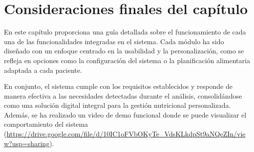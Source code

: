 \section{Consideraciones finales del capítulo}
En este capítulo proporciona una guía detallada sobre el funcionamiento de cada una de las funcionalidades integradas en el sistema.
Cada módulo ha sido diseñado con un enfoque centrado en la usabilidad y la personalización, como se refleja en opciones como la configuración del sistema o la planificación alimentaria adaptada a cada paciente. 

En conjunto, el sistema cumple con los requisitos establecidos y responde de manera efectiva a las necesidades detectadas durante el análisis, consolidándose como una solución digital integral para la gestión nutricional personalizada. Además, se ha realizado un video de demo funcional donde se puede visualizar el comportamiento del sistema (\url{https://drive.google.com/file/d/10IC1oFVbOKyTe_VdsKLkdpSt9aNQeZIn/view?usp=sharing}).
